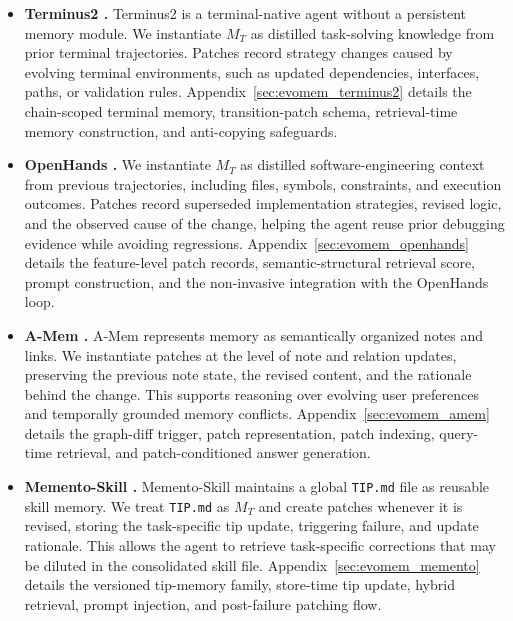 \documentclass{article}
\begin{document}
\begin{itemize}[leftmargin=*]
    \item \textbf{Terminus2 \cite{terminal-bench}.}
    Terminus2 is a terminal-native agent without a persistent memory module. We instantiate $M_T$ as distilled task-solving knowledge from prior terminal trajectories. Patches record strategy changes caused by evolving terminal environments, such as updated dependencies, interfaces, paths, or validation rules.  Appendix~\ref{sec:evomem_terminus2} details the chain-scoped terminal memory, transition-patch schema, retrieval-time memory construction, and anti-copying safeguards.

    \item \textbf{OpenHands \cite{openhands}.}
    We instantiate $M_T$ as distilled software-engineering context from previous trajectories, including files, symbols, constraints, and execution outcomes. Patches record superseded implementation strategies, revised logic, and the observed cause of the change, helping the agent reuse prior debugging evidence while avoiding regressions. Appendix~\ref{sec:evomem_openhands} details the feature-level patch records, semantic-structural retrieval score, prompt construction, and the non-invasive integration with the OpenHands loop.

    \item \textbf{A-Mem \cite{xu2025amem}.}
    A-Mem represents memory as semantically organized notes and links. We instantiate patches at the level of note and relation updates, preserving the previous note state, the revised content, and the rationale behind the change. This supports reasoning over evolving user preferences and temporally grounded memory conflicts. Appendix~\ref{sec:evomem_amem} details the graph-diff trigger, patch representation, patch indexing, query-time retrieval, and patch-conditioned answer generation.

    \item \textbf{Memento-Skill \cite{memento-s}.}
    Memento-Skill maintains a global \texttt{TIP.md} file as reusable skill memory. We treat \texttt{TIP.md} as $M_T$ and create patches whenever it is revised, storing the task-specific tip update, triggering failure, and update rationale. This allows the agent to retrieve task-specific corrections that may be diluted in the consolidated skill file. Appendix~\ref{sec:evomem_memento} details the versioned tip-memory family, store-time tip update, hybrid retrieval, prompt injection, and post-failure patching flow.
\end{itemize}
\end{document}
